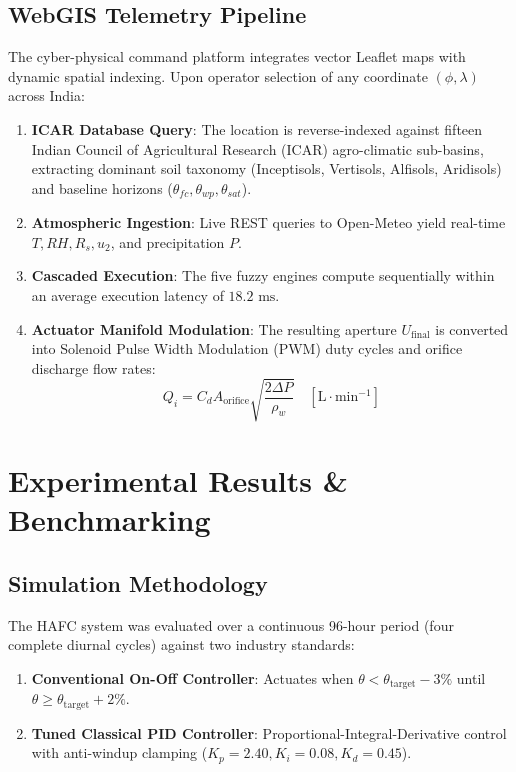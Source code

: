\documentclass[conference]{IEEEtran}
\begin{document}
\subsection{WebGIS Telemetry Pipeline}
The cyber-physical command platform integrates vector Leaflet maps with dynamic spatial indexing. Upon operator selection of any coordinate $(\phi, \lambda)$ across India:
\begin{enumerate}
    \item \textbf{ICAR Database Query}: The location is reverse-indexed against fifteen Indian Council of Agricultural Research (ICAR) agro-climatic sub-basins, extracting dominant soil taxonomy (Inceptisols, Vertisols, Alfisols, Aridisols) and baseline horizons ($\theta_{fc}, \theta_{wp}, \theta_{sat}$).
    \item \textbf{Atmospheric Ingestion}: Live REST queries to Open-Meteo yield real-time $T, RH, R_s, u_2$, and precipitation $P$.
    \item \textbf{Cascaded Execution}: The five fuzzy engines compute sequentially within an average execution latency of $18.2\text{ ms}$.
    \item \textbf{Actuator Manifold Modulation}: The resulting aperture $U_{\text{final}}$ is converted into Solenoid Pulse Width Modulation (PWM) duty cycles and orifice discharge flow rates:
    \begin{equation}
    Q_i = C_d A_{\text{orifice}} \sqrt{\frac{2 \Delta P}{\rho_w}} \quad [\text{L}\cdot\text{min}^{-1}]
    \end{equation}
\end{enumerate}

\section{Experimental Results \& Benchmarking}

\subsection{Simulation Methodology}
The HAFC system was evaluated over a continuous 96-hour period (four complete diurnal cycles) against two industry standards:
\begin{enumerate}
    \item \textbf{Conventional On-Off Controller}: Actuates when $\theta < \theta_{\text{target}} - 3\%$ until $\theta \ge \theta_{\text{target}} + 2\%$.
    \item \textbf{Tuned Classical PID Controller}: Proportional-Integral-Derivative control with anti-windup clamping ($K_p = 2.40, K_i = 0.08, K_d = 0.45$).
\end{enumerate}
\end{document}
